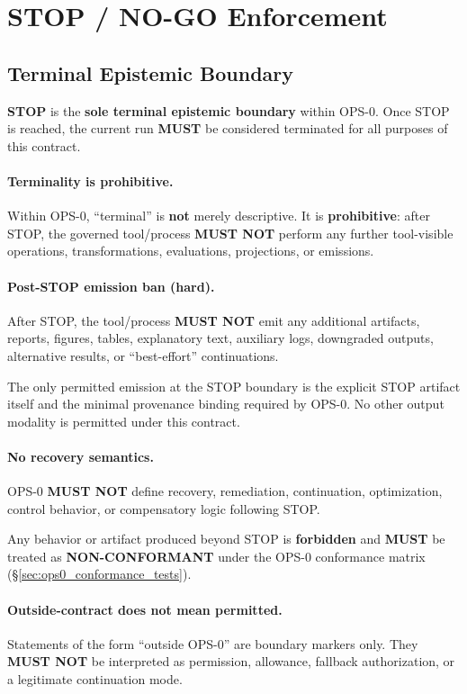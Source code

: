 ﻿\section{STOP / NO-GO Enforcement}
\label{sec:ops0_stop_nogo_enforcement}

\subsection{Terminal Epistemic Boundary}
\textbf{STOP} is the \textbf{sole terminal epistemic boundary} within OPS-0.
Once STOP is reached, the current run \textbf{MUST} be considered terminated
for all purposes of this contract.

\paragraph{Terminality is prohibitive.}
Within OPS-0, ``terminal'' is \textbf{not} merely descriptive.
It is \textbf{prohibitive}: after STOP, the governed tool/process
\textbf{MUST NOT} perform any further tool-visible operations,
transformations, evaluations, projections, or emissions.

\paragraph{Post-STOP emission ban (hard).}
After STOP, the tool/process \textbf{MUST NOT} emit any additional artifacts,
reports, figures, tables, explanatory text, auxiliary logs, downgraded
outputs, alternative results, or ``best-effort'' continuations.

The only permitted emission at the STOP boundary is the explicit
STOP artifact itself and the minimal provenance binding required by OPS-0.
No other output modality is permitted under this contract.

\paragraph{No recovery semantics.}
OPS-0 \textbf{MUST NOT} define recovery, remediation, continuation,
optimization, control behavior, or compensatory logic following STOP.

Any behavior or artifact produced beyond STOP is \textbf{forbidden}
and \textbf{MUST} be treated as \textbf{NON-CONFORMANT} under the OPS-0
conformance matrix (\S\ref{sec:ops0_conformance_tests}).

\paragraph{Outside-contract does not mean permitted.}
Statements of the form ``outside OPS-0'' are boundary markers only.
They \textbf{MUST NOT} be interpreted as permission, allowance,
fallback authorization, or a legitimate continuation mode.

